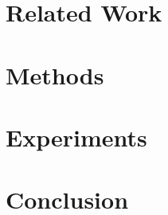 \documentclass{article}
\begin{document}
\section{Related Work}
\label{sec:related_work}


\section{Methods}
\label{sec:methods}


\section{Experiments}
\label{sec:experiments}


\section{Conclusion}




\end{document}
